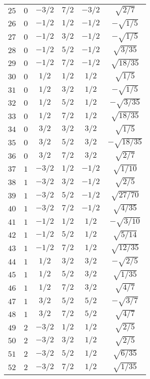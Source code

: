 \begin{table}
\begin{center}
\begin{tabular}{|c|c|c|c|c|c|}
$25$ & $0$ & $-3/2$ & $7/2$ & $-3/2$ & $\sqrt{2/7}$ \\ 
$26$ & $0$ & $-1/2$ & $1/2$ & $-1/2$ & $-\sqrt{1/5}$ \\ 
$27$ & $0$ & $-1/2$ & $3/2$ & $-1/2$ & $-\sqrt{1/5}$ \\ 
$28$ & $0$ & $-1/2$ & $5/2$ & $-1/2$ & $\sqrt{3/35}$ \\ 
$29$ & $0$ & $-1/2$ & $7/2$ & $-1/2$ & $\sqrt{18/35}$ \\ 
$30$ & $0$ & $1/2$ & $1/2$ & $1/2$ & $\sqrt{1/5}$ \\ 
$31$ & $0$ & $1/2$ & $3/2$ & $1/2$ & $-\sqrt{1/5}$ \\ 
$32$ & $0$ & $1/2$ & $5/2$ & $1/2$ & $-\sqrt{3/35}$ \\ 
$33$ & $0$ & $1/2$ & $7/2$ & $1/2$ & $\sqrt{18/35}$ \\ 
$34$ & $0$ & $3/2$ & $3/2$ & $3/2$ & $\sqrt{1/5}$ \\ 
$35$ & $0$ & $3/2$ & $5/2$ & $3/2$ & $-\sqrt{18/35}$ \\ 
$36$ & $0$ & $3/2$ & $7/2$ & $3/2$ & $\sqrt{2/7}$ \\ 
$37$ & $1$ & $-3/2$ & $1/2$ & $-1/2$ & $\sqrt{1/10}$ \\ 
$38$ & $1$ & $-3/2$ & $3/2$ & $-1/2$ & $\sqrt{2/5}$ \\ 
$39$ & $1$ & $-3/2$ & $5/2$ & $-1/2$ & $\sqrt{27/70}$ \\ 
$40$ & $1$ & $-3/2$ & $7/2$ & $-1/2$ & $\sqrt{4/35}$ \\ 
$41$ & $1$ & $-1/2$ & $1/2$ & $1/2$ & $-\sqrt{3/10}$ \\ 
$42$ & $1$ & $-1/2$ & $5/2$ & $1/2$ & $\sqrt{5/14}$ \\ 
$43$ & $1$ & $-1/2$ & $7/2$ & $1/2$ & $\sqrt{12/35}$ \\ 
$44$ & $1$ & $1/2$ & $3/2$ & $3/2$ & $-\sqrt{2/5}$ \\ 
$45$ & $1$ & $1/2$ & $5/2$ & $3/2$ & $\sqrt{1/35}$ \\ 
$46$ & $1$ & $1/2$ & $7/2$ & $3/2$ & $\sqrt{4/7}$ \\ 
$47$ & $1$ & $3/2$ & $5/2$ & $5/2$ & $-\sqrt{3/7}$ \\ 
$48$ & $1$ & $3/2$ & $7/2$ & $5/2$ & $\sqrt{4/7}$ \\ 
$49$ & $2$ & $-3/2$ & $1/2$ & $1/2$ & $\sqrt{2/5}$ \\ 
$50$ & $2$ & $-3/2$ & $3/2$ & $1/2$ & $\sqrt{2/5}$ \\ 
$51$ & $2$ & $-3/2$ & $5/2$ & $1/2$ & $\sqrt{6/35}$ \\ 
$52$ & $2$ & $-3/2$ & $7/2$ & $1/2$ & $\sqrt{1/35}$ \\ 

\end{tabular}
\end{center}
\end{table}
